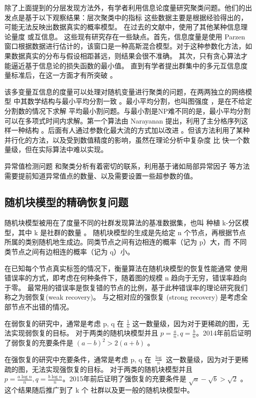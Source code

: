 \documentclass{ctexart}
\begin{document}
除了上面提到的分层发现方法外，有学者利用信息论度量研究聚类问题。他们的出发点是基于以下观察结果：层次聚类中的指标
这些数据主要是根据经验得出的，可能无法反映出数据真实的概率模型。
在过去的文献中，使用了其他某种信息理论量度 \cite{ic2002} 或互信息\cite{mim}。
这些现有研究存在一些缺点。首先，信息度量是使用 Parzen 窗口根据数据进行估计的，该窗口是一种高斯混合模型。对于这种参数化方法，如果数据真实的分布与假设相距甚远，则结果会很不准确。
其次，只有贪心算法才能逼近基于信息论的损失函数的最小值。 
直到有学者提出群集中的多元互信息度量标准后，在这一方面才有所突破 \cite{ic2016}。 

该多变量互信息的度量可以处理对随机变量进行聚类的问题，在两两独立的网络模型 \cite{pin}
中其数学结构与最小平均分割一致  \cite{mac}。最小平均分割，也叫图强度 \cite{cunningham1985optimal}，是在不给定分割数的情况下求解
平均最小割问题。与最小割是NP难不同的是，最小平均分割可以在多项式时间内求解。第一个算法由 Narayanan 提出，利用了主分格序列这样一种结构 \cite{narayanan}。后面有人通过参数化最大流的方式加以改进 \cite{RN17}。但该方法利用了某种并行化的方法，以及受到数值精度的影响，虽然在理论分析中复杂度
比 \cite{narayanan} 快一个数量级，但在实际算法中难以实现。

异常值检测问题 \cite{grubbs1969procedures} 和聚类分析有着密切的联系，利用基于诸如局部异常因子 \cite{Breunig} 等方法需要提前知道异常值点的数量、以及需要设置一些超参数的值。
\subsection{随机块模型的精确恢复问题}
随机块模型被用在了度量不同的社群发现算法的基准数据集，也叫 种植 k-分区模型，其中 k 是社群的数量 。
随机块模型的生成是先给定 n 个节点，再根据节点所属的类别随机地生成边。同类节点之间有边相连的概率（记为 p）大，而
不同类节点之间有边相连的概率（记为 q）小。\cite{abbe2017community}

在已知每个节点真实标签的情况下，衡量算法在随机块模型的恢复性能通常
使用错误率的方式，即考虑在何种条件下，随着图的规模 n 趋向于无穷，错误率趋向于零。
最常用的错误率是恢复错的节点的比例，基于此种错误率的理论研究我们称之为弱恢复(weak recovery)。
与之相对应的强恢复 (strong recovery) 是考虑全部节点不出错的情况。

在弱恢复的研究中，通常是考虑 p, q 在 $\frac{1}{n}$ 这一数量级，因为对于更稀疏的图，无法实现弱恢复的目标。
对于两类的随机块模型并且 $p=\frac{a}{n}, q = \frac{b}{n}$。2014年前后证明了弱恢复的充要条件是 $(a-b)^2 > 2(a+b)$
\cite{mossel2015reconstruction, mossel2018proof}。

在强恢复的研究中充要条件，通常是考虑 p, q 在 $\frac{\log}{n}$ 这一数量级，因为对于更稀疏的图，无法实现强恢复的目标。
对于两类的随机块模型并且 $p=\frac{a \log n}{n}, q = \frac{b \log n }{n}$。2015年前后证明了强恢复的充要条件是
$\sqrt{a} - \sqrt{b} > \sqrt{2}$ \cite{abbe2015exact, mossel2016}。这个结果随后推广到了 k 个
社群以及更一般的随机块模型中\cite{abbe2015community}。
\end{document}
